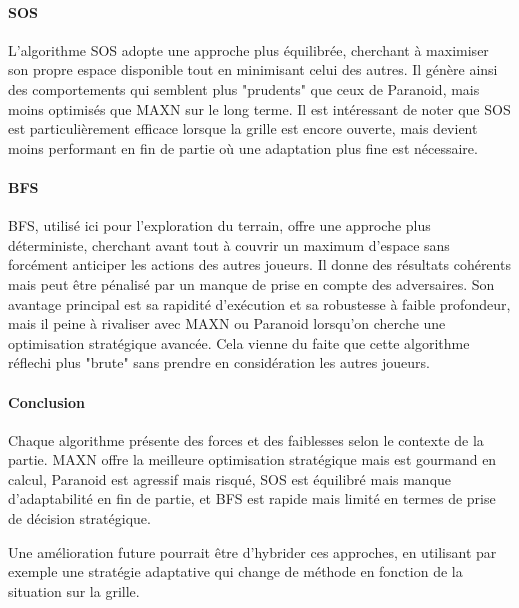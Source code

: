 \paragraph{SOS}
L’algorithme SOS adopte une approche plus équilibrée, cherchant à maximiser son propre espace disponible tout en minimisant celui des autres. Il génère ainsi des comportements qui semblent plus "prudents" que ceux de Paranoid, mais moins optimisés que MAXN sur le long terme. Il est intéressant de noter que SOS est particulièrement efficace lorsque la grille est encore ouverte, mais devient moins performant en fin de partie où une adaptation plus fine est nécessaire.
\newpage
\paragraph{BFS}
BFS, utilisé ici pour l’exploration du terrain, offre une approche plus déterministe, cherchant avant tout à couvrir un maximum d’espace sans forcément anticiper les actions des autres joueurs. Il donne des résultats cohérents mais peut être pénalisé par un manque de prise en compte des adversaires. Son avantage principal est sa rapidité d’exécution et sa robustesse à faible profondeur, mais il peine à rivaliser avec MAXN ou Paranoid lorsqu’on cherche une optimisation stratégique avancée. Cela vienne du faite que cette algorithme réflechi plus "brute" sans prendre en considération les autres joueurs.
\paragraph{Conclusion}
Chaque algorithme présente des forces et des faiblesses selon le contexte de la partie. MAXN offre la meilleure optimisation stratégique mais est gourmand en calcul, Paranoid est agressif mais risqué, SOS est équilibré mais manque d’adaptabilité en fin de partie, et BFS est rapide mais limité en termes de prise de décision stratégique.

Une amélioration future pourrait être d’hybrider ces approches, en utilisant par exemple une stratégie adaptative qui change de méthode en fonction de la situation sur la grille.
